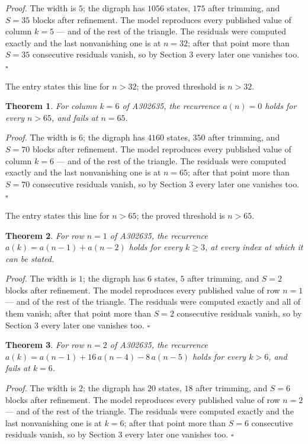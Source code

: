 \documentclass[11pt]{article}
\newtheorem{theorem}{Theorem}
\theoremstyle{definition}
\begin{document}
{\itshape Proof.} The width is $5$; the digraph has $1056$ states, $175$ after trimming, and $S = 35$ blocks after refinement. The model reproduces every published value of column $k = 5$ --- and of the rest of the triangle. The residuals were computed exactly and the last nonvanishing one is at $n = 32$; after that point more than $S = 35$ consecutive residuals vanish, so by Section 3 every later one vanishes too. $\square$

The entry states this line for $n > 32$; the proved threshold is $n > 32$.

\begin{theorem} For column $k = 6$ of A302635, the recurrence $a(n) = 0$ holds for every $n > 65$, and fails at $n = 65$.\end{theorem}

{\itshape Proof.} The width is $6$; the digraph has $4160$ states, $350$ after trimming, and $S = 70$ blocks after refinement. The model reproduces every published value of column $k = 6$ --- and of the rest of the triangle. The residuals were computed exactly and the last nonvanishing one is at $n = 65$; after that point more than $S = 70$ consecutive residuals vanish, so by Section 3 every later one vanishes too. $\square$

The entry states this line for $n > 65$; the proved threshold is $n > 65$.

\begin{theorem} For row $n = 1$ of A302635, the recurrence $a(k) = a(n-1) + a(n-2)$ holds for every $k \ge 3$, at every index at which it can be stated.\end{theorem}

{\itshape Proof.} The width is $1$; the digraph has $6$ states, $5$ after trimming, and $S = 2$ blocks after refinement. The model reproduces every published value of row $n = 1$ --- and of the rest of the triangle. The residuals were computed exactly and all of them vanish; after that point more than $S = 2$ consecutive residuals vanish, so by Section 3 every later one vanishes too. $\square$

\begin{theorem} For row $n = 2$ of A302635, the recurrence $a(k) = a(n-1) + 16\,a(n-4) - 8\,a(n-5)$ holds for every $k > 6$, and fails at $k = 6$.\end{theorem}

{\itshape Proof.} The width is $2$; the digraph has $20$ states, $18$ after trimming, and $S = 6$ blocks after refinement. The model reproduces every published value of row $n = 2$ --- and of the rest of the triangle. The residuals were computed exactly and the last nonvanishing one is at $k = 6$; after that point more than $S = 6$ consecutive residuals vanish, so by Section 3 every later one vanishes too. $\square$
\end{document}
